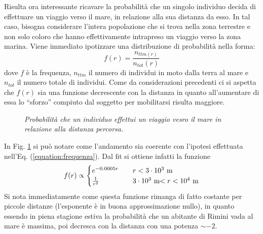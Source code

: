 \documentclass[12pt,a4paper]{article}
\begin{document}
Risulta ora interessante ricavare la probabilità che un singolo individuo decida di effettuare un viaggio verso il mare, in relazione alla sua distanza da esso.
In tal caso, bisogna considerare l'intera popolazione che si trova nella zona terrestre e non solo coloro che hanno effettivamente intrapreso un viaggio verso la zona marina.
Viene immediato ipotizzare una distribuzione di probabilità nella forma:
\begin{equation}
    f(r)=\frac{n_{ttm(r)}}{n_{tot}(r)}
    \label{equation:frequenza}
\end{equation}
dove $f$ è la frequenza, $n_{ttm}$ il numero di individui in moto dalla terra al mare e $n_{tot}$ il numero totale di individui.
Come da considerazioni precedenti ci si aspetta che $f(r)$ sia una funzione decrescente con la distanza in quanto all'aumentare di essa lo ``sforzo'' compiuto dal soggetto per mobilitarsi risulta maggiore.
\begin{figure}[H]
\centering
{}
\caption{\emph{Probabilità che un individuo effettui un viaggio vesro il mare in relazione alla distanza percorsa.}}
\label{figure:frequenza}
\end{figure}
In Fig. \ref{figure:frequenza} si può notare come l'andamento sia coerente con l'ipotesi effettuata nell'Eq. (\ref{equation:frequenza}).
Dal fit si ottiene infatti la funzione
\begin{equation}
f(r)\propto
\begin{cases}
e^{-0.0005 r} \quad &r<3\cdot 10^3$ m$\\
\frac{1}{r^2} \quad &3\cdot 10^3$ m$ < r < 10^4$ m$
\end{cases}
\label{equation:f(r)}
\end{equation}
Si nota immediatamente come questa funzione rimanga di fatto costante per piccole distanze (l'esponente è in buona approssimazione nullo), in quanto essendo in piena stagione estiva la probabilità che un abitante di Rimini vada al mare è massima, poi decresca con la distanza con una potenza $\sim -2$.
\end{document}

